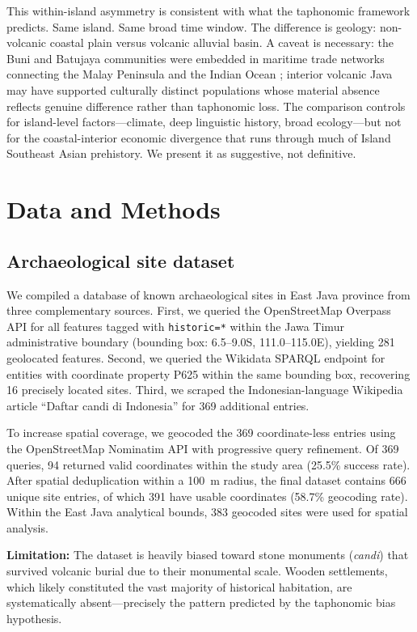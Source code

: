 \documentclass[egqsj, manuscript]{copernicus}
\begin{document}
This within-island asymmetry is consistent with what the taphonomic framework predicts. Same island. Same broad time window. The difference is geology: non-volcanic coastal plain versus volcanic alluvial basin. A caveat is necessary: the Buni and Batujaya communities were embedded in maritime trade networks connecting the Malay Peninsula and the Indian Ocean \citep{bellina2014,manguin2011}; interior volcanic Java may have supported culturally distinct populations whose material absence reflects genuine difference rather than taphonomic loss. The comparison controls for island-level factors---climate, deep linguistic history, broad ecology---but not for the coastal-interior economic divergence that runs through much of Island Southeast Asian prehistory. We present it as suggestive, not definitive.


\section{Data and Methods}

\subsection{Archaeological site dataset}

We compiled a database of known archaeological sites in East Java province from three complementary sources. First, we queried the OpenStreetMap Overpass API for all features tagged with \texttt{historic=*} within the Jawa Timur administrative boundary (bounding box: 6.5--9.0\textdegree{}S, 111.0--115.0\textdegree{}E), yielding 281 geolocated features. Second, we queried the Wikidata SPARQL endpoint for entities with coordinate property P625 within the same bounding box, recovering 16 precisely located sites. Third, we scraped the Indonesian-language Wikipedia article ``Daftar candi di Indonesia'' for 369 additional entries.

To increase spatial coverage, we geocoded the 369 coordinate-less entries using the OpenStreetMap Nominatim API with progressive query refinement. Of 369 queries, 94 returned valid coordinates within the study area (25.5\% success rate). After spatial deduplication within a 100~m radius, the final dataset contains 666 unique site entries, of which 391 have usable coordinates (58.7\% geocoding rate). Within the East Java analytical bounds, 383 geocoded sites were used for spatial analysis.

\textbf{Limitation:} The dataset is heavily biased toward stone monuments (\textit{candi}) that survived volcanic burial due to their monumental scale. Wooden settlements, which likely constituted the vast majority of historical habitation, are systematically absent---precisely the pattern predicted by the taphonomic bias hypothesis.
\end{document}
